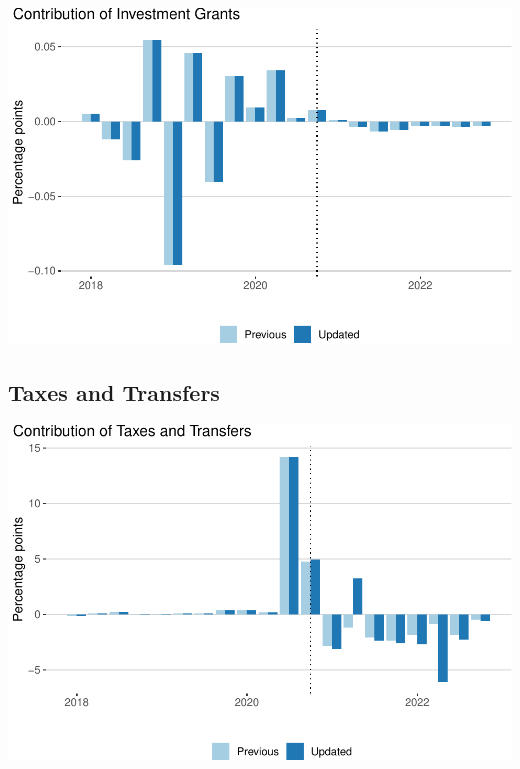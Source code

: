 \documentclass[
]{article}
\begin{document}
\begin{center}\includegraphics{compare-update_files/figure-latex/igrants-1} \end{center}

\hypertarget{taxes-and-transfers}{%
\subsection{Taxes and Transfers}\label{taxes-and-transfers}}

\begin{center}\includegraphics{compare-update_files/figure-latex/tts-1} \end{center}
\end{document}
